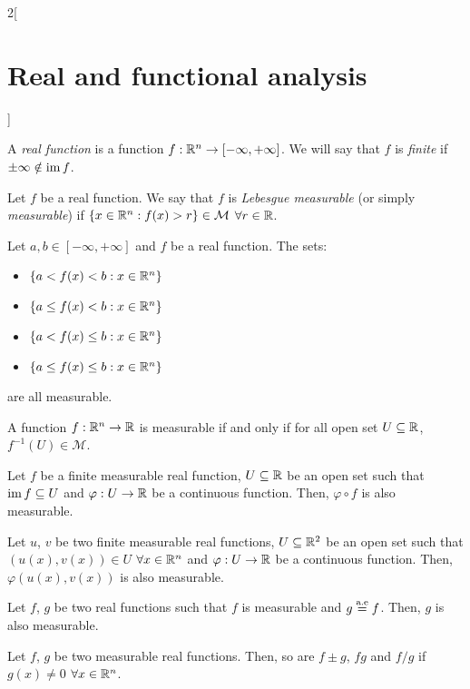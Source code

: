 \documentclass[../../../main_math.tex]{subfiles}
\begin{document}
\begin{multicols}{2}[\section{Real and functional analysis}]
\begin{definition}
    A \emph{real function} is a function $f:\mathbb{R}^n\rightarrow[-\infty,+\infty]$. We will say that $f$ is \emph{finite} if $\pm\infty\notin\operatorname{im} f$.
  \end{definition}
  \begin{definition}
    Let $f$ be a real function. We say that $f$ is \emph{Lebesgue measurable} (or simply \emph{measurable}) if $\{x\in\mathbb{R}^n:f(x)> r\}\in \mathcal{M}$ $\forall r\in\mathbb{R}$.
  \end{definition}
  \begin{lemma}
    Let $a,b\in[-\infty,+\infty]$ and $f$ be a real function. The sets:
    \begin{itemize}
      \item $\{a<f(x)<b:x\in\mathbb{R}^n\}$
      \item $\{a\leq f(x)<b:x\in\mathbb{R}^n\}$
      \item $\{a<f(x)\leq b:x\in\mathbb{R}^n\}$
      \item $\{a\leq f(x)\leq b:x\in\mathbb{R}^n\}$
    \end{itemize}
    are all measurable.
  \end{lemma}
  \begin{proposition}
    A function $f:\mathbb{R}^n\rightarrow\mathbb{R}$ is measurable if and only if for all open set $U\subseteq \mathbb{R}$, $f^{-1}(U)\in\mathcal{M}$.
  \end{proposition}
  \begin{proposition}
    Let $f$ be a finite measurable real function, $U\subseteq\mathbb{R}$ be an open set such that $\operatorname{im} f\subseteq U$ and $\varphi:U\rightarrow\mathbb{R}$ be a continuous function. Then, $\varphi\circ f$ is also measurable.
  \end{proposition}
  \begin{proposition}
    Let $u$, $v$ be two finite measurable real functions, $U\subseteq\mathbb{R}^2$ be an open set such that $(u(x),v(x))\in U$ $\forall x\in\mathbb{R}^n$ and $\varphi:U\rightarrow\mathbb{R}$ be a continuous function. Then, $\varphi(u(x),v(x))$ is also measurable.
  \end{proposition}
  \begin{proposition}
    Let $f$, $g$ be two real functions such that $f$ is measurable and $g\overset{\text{a.e}}{=} f$. Then, $g$ is also measurable.
  \end{proposition}
  \begin{proposition}
    Let $f$, $g$ be two measurable real functions. Then, so are $f\pm g$, $fg$ and $f/g$ if $g(x)\ne 0$ $\forall x\in\mathbb{R}^n$.
  \end{proposition}
  \begin{proposition}

\end{proposition}
\end{multicols}
\end{document}
